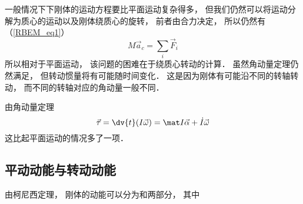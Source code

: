 

一般情况下下刚体的运动方程要比平面运动复杂得多， 但我们仍然可以将运动分解为质心的运动以及刚体绕质心的旋转， 前者由合力决定， 所以仍然有（\autoref{RBEM_eq1}）
\begin{equation}
M\vec a_c = \sum_i \vec F_i
\end{equation}
所以相对于平面运动， 该问题的困难在于绕质心转动的计算． 虽然角动量定理仍然满足， 但转动惯量将有可能随时间变化． 这是因为刚体有可能沿不同的转轴转动， 而不同的转轴对应的角动量一般不同．

由角动量定理
\begin{equation}
\vec \tau = \dv{t}(I \vec \omega) = \mat I \vec \alpha + \dot I \vec \omega
\end{equation}
这比起平面运动的情况多了一项．


\subsection{平动动能与转动动能}
由柯尼西定理， 刚体的动能可以分为和两部分， 其中

